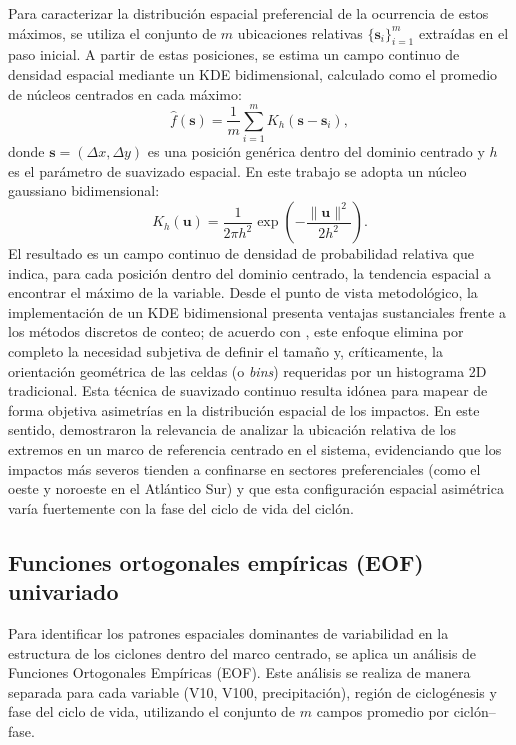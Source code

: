 Para caracterizar la distribución espacial preferencial de la ocurrencia de estos máximos, se utiliza el conjunto de $m$ ubicaciones relativas $\{\mathbf{s}_i\}_{i=1}^{m}$ extraídas en el paso inicial. A partir de estas posiciones, se estima un campo continuo de densidad espacial mediante un KDE bidimensional, calculado como el promedio de núcleos centrados en cada máximo:
\begin{equation}
\hat f(\mathbf{s})=\frac{1}{m}\sum_{i=1}^{m} K_h(\mathbf{s}-\mathbf{s}_i),
\label{eq:kde_simple}
\end{equation}
donde $\mathbf{s}=(\Delta x,\Delta y)$ es una posición genérica dentro del dominio centrado y $h$ es el parámetro de suavizado espacial. En este trabajo se adopta un núcleo gaussiano bidimensional:
\begin{equation}
K_h(\mathbf{u})=\frac{1}{2\pi h^2}\exp\!\left(-\frac{\|\mathbf{u}\|^2}{2h^2}\right).
\label{eq:gauss_kernel_2d_simple}
\end{equation}
El resultado es un campo continuo de densidad de probabilidad relativa que indica, para cada posición dentro del dominio centrado, la tendencia espacial a encontrar el máximo de la variable. Desde el punto de vista metodológico, la implementación de un KDE bidimensional presenta ventajas sustanciales frente a los métodos discretos de conteo; de acuerdo con \citet{weglarczyk2018kernel}, este enfoque elimina por completo la necesidad subjetiva de definir el tamaño y, críticamente, la orientación geométrica de las celdas (o \textit{bins}) requeridas por un histograma 2D tradicional. Esta técnica de suavizado continuo resulta idónea para mapear de forma objetiva asimetrías en la distribución espacial de los impactos. En este sentido, \citet{gramcianinov2023impact} demostraron la relevancia de analizar la ubicación relativa de los extremos en un marco de referencia centrado en el sistema, evidenciando que los impactos más severos tienden a confinarse en sectores preferenciales (como el oeste y noroeste en el Atlántico Sur) y que esta configuración espacial asimétrica varía fuertemente con la fase del ciclo de vida del ciclón.
\subsection{Funciones ortogonales empíricas (EOF) univariado}\label{subsec:eof_univariado}

Para identificar los patrones espaciales dominantes de variabilidad en la estructura de los ciclones dentro del marco centrado, se aplica un análisis de Funciones Ortogonales Empíricas (EOF). Este análisis se realiza de manera separada para cada variable (V10, V100, precipitación), región de ciclogénesis y fase del ciclo de vida, utilizando el conjunto de $m$ campos promedio por ciclón--fase.

